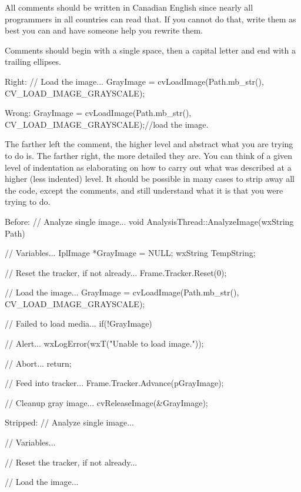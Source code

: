 \startitemize[3]
\setupwhitespace[big]
\item
All comments should be written in Canadian English since nearly all programmers in all countries can read that. If you cannot do that, write them as best you can and have someone help you rewrite them.

\item
Comments should begin with a single space, then a capital letter and end with a trailing ellipses. 

Right:
\startCodeExample
// Load the image...
GrayImage = cvLoadImage(Path.mb_str(), CV_LOAD_IMAGE_GRAYSCALE);
\stopCodeExample

Wrong:
\startCodeExample
GrayImage = cvLoadImage(Path.mb_str(), CV_LOAD_IMAGE_GRAYSCALE);//load the image.
\stopCodeExample

\item
The farther left the comment, the higher level and abstract what you are trying to do is. The farther right, the more detailed they are. You can think of a given level of indentation as elaborating on how to carry out what was described at a higher (less indented) level. It should be possible in many cases to strip away all the code, except the comments, and still understand what it is that you were trying to do.

Before:
\startCodeExample
// Analyze single image...
void AnalysisThread::AnalyzeImage(wxString Path)
{
    // Variables...
    IplImage   *GrayImage   = NULL;
    wxString    TempString;

    // Reset the tracker, if not already...
    Frame.Tracker.Reset(0);

    // Load the image...
    GrayImage = cvLoadImage(Path.mb_str(), CV_LOAD_IMAGE_GRAYSCALE);

        // Failed to load media...
        if(!GrayImage)
        {
            // Alert...
            wxLogError(wxT("Unable to load image."));
            
            // Abort...
            return;
        }

    // Feed into tracker...
    Frame.Tracker.Advance(pGrayImage);
    
    // Cleanup gray image...
    cvReleaseImage(&GrayImage);
}
\stopCodeExample

Stripped:
\startCodeExample
// Analyze single image...

    // Variables...

    // Reset the tracker, if not already...

    // Load the image...

